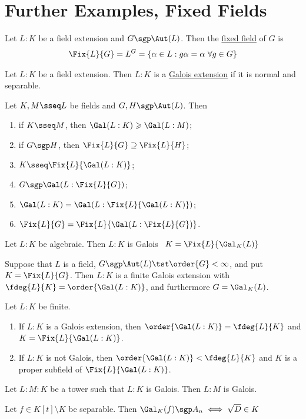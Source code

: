 \documentclass[a4paper]{article}
\begin{document}
\section{Further Examples, Fixed Fields}
\begin{tdefinition}
  Let \( L:K \) be a field extension and \( G\sgp \Aut(L) \). Then the \ul{fixed field} of \( G \) is \begin{align*}
    \Fix{L}{G} = L^G = \{\alpha\in L : g\alpha= \alpha\ \forall g\in G\}
  \end{align*}
\end{tdefinition}

\begin{tdefinition}
  Let \( L:K \) be a field extension.
  Then \( L:K \) is a \ul{Galois extension} if it is normal and separable.
\end{tdefinition}

\begin{tlemma}
  Let \( K,M \sseq L \) be fields and \( G, H \sgp \Aut(L) \).
  Then \begin{enumerate}[label=\arabic*)]
    \item if \( K\sseq M \), then \( \Gal(L:K) \geqslant \Gal(L:M) \);
    \item if \( G\sgp H \), then \( \Fix{L}{G} \supseteq \Fix{L}{H} \);
    \item \( K\sseq \Fix{L}{\Gal(L:K)} \);
    \item \( G\sgp\Gal(L:\Fix{L}{G}) \);
    \item \( \Gal(L:K) = \Gal(L:\Fix{L}{\Gal(L:K)}) \);
    \item \( \Fix{L}{G} = \Fix{L}{\Gal(L:\Fix{L}{G})} \).
  \end{enumerate}
\end{tlemma}

\begin{ttheorem}
  Let \( L:K \) be algebraic.
  Then \( L:K \) is Galois \iff~\( K=\Fix{L}{\Gal_K(L)} \)
\end{ttheorem}

\begin{ttheorem}
  Suppose that \( L \) is a field, \( G\sgp \Aut(L) \tst \order{G}<\infty\), and put \( K=\Fix{L}{G} \).
  Then \( L:K \) is a finite Galois extension with \( \fdeg{L}{K}=\order{\Gal(L:K)} \), and furthermore \( G=\Gal_K(L) \).
\end{ttheorem}

\begin{ttheorem}
  Let \( L:K \) be finite.
  \begin{enumerate}
    \item If \( L:K \) is a Galois extension, then \( \order{\Gal(L:K)}=\fdeg{L}{K} \) and \( K=\Fix{L}{\Gal(L:K)} \).
    \item If \( L:K \) is not Galois, then \( \order{\Gal(L:K)}<\fdeg{L}{K} \) and \( K \) is a proper subfield of \( \Fix{L}{\Gal(L:K)} \).
  \end{enumerate}
\end{ttheorem}

\begin{tcorollary}
  Let \( L:M:K \) be a tower such that \( L:K \) is Galois.
  Then \( L:M \) is Galois.
\end{tcorollary}

\begin{tproposition}
  Let \( f \in K[t]\setminus K \) be separable.
  Then \( \Gal_K(f)\sgp A_n \iff \sqrt D\in K \)
\end{tproposition}
\end{document}
